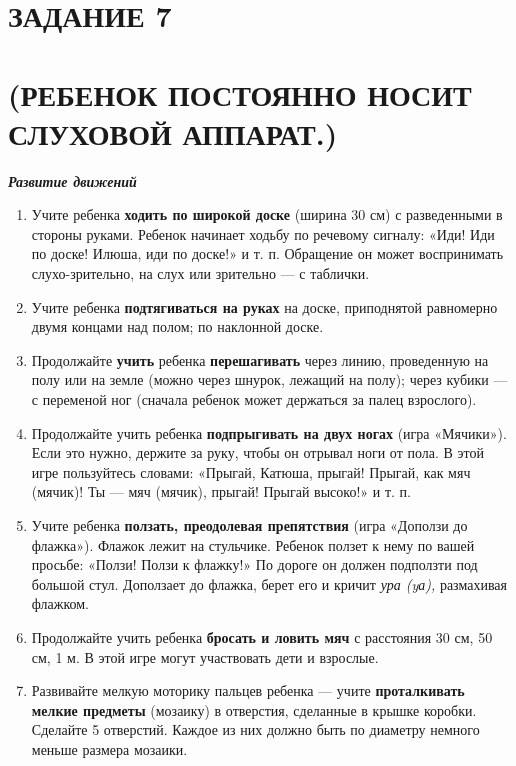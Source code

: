 \documentclass{book}
\renewcommand{\emph}[1]{\textit{#1}}
\begin{document}
\section{ЗАДАНИЕ 7}\section*{(РЕБЕНОК ПОСТОЯННО НОСИТ СЛУХОВОЙ АППАРАТ.)}

\emph{\textbf{Развитие движений}}


\begin{enumerate}
\def\labelenumi{\arabic{enumi}.}
\item
  
  Учите ребенка \textbf{ходить по широкой доске} (ширина 30 см) с
  разведенными в стороны руками. Ребенок начинает ходьбу по речевому
  сигналу: «Иди! Иди по доске! Илюша, иди по доске!» и т. п. Обращение
  он может воспринимать слухо-зрительно, на слух или зрительно --- с
  таблички.
  
\item
  
  Учите ребенка \textbf{подтягиваться на руках} на доске, приподнятой
  равномерно двумя концами над полом; по наклонной доске.
  
\item
  
  Продолжайте \textbf{учить} ребенка \textbf{перешагивать} через линию,
  проведенную на полу или на земле (можно через шнурок, лежащий на
  полу); через кубики --- с переменой ног (сначала ребенок может
  держаться за палец взрослого).
  
\item
  
  Продолжайте учить ребенка \textbf{подпрыгивать на двух ногах} (игра
  «Мячики»). Если это нужно, держите за руку, чтобы он отрывал ноги от
  пола. В этой игре пользуйтесь словами: «Прыгай, Катюша, прыгай!
  Прыгай, как мяч (мячик)! Ты --- мяч (мячик), прыгай! Прыгай высоко!» и
  т. п.
  
\item
  
  Учите ребенка \textbf{ползать, преодолевая препятствия} (игра «Доползи
  до флажка»). Флажок лежит на стульчике. Ребенок ползет к нему по вашей
  просьбе: «Ползи! Ползи к флажку!» По дороге он должен подползти под
  большой стул. Доползает до флажка, берет его и кричит \emph{ура (yа),}
  размахивая флажком.
  
\item
  
  Продолжайте учить ребенка \textbf{бросать и ловить мяч} с расстояния
  30 см, 50 см, 1 м. В этой игре могут участвовать дети и взрослые.
  
\item
  
  Развивайте мелкую моторику пальцев ребенка --- учите
  \textbf{проталкивать мелкие предметы} (мозаику) в отверстия, сделанные
  в крышке коробки. Сделайте 5 отверстий. Каждое из них должно быть по
  диаметру немного меньше размера мозаики.
  
\end{enumerate}
\end{document}
